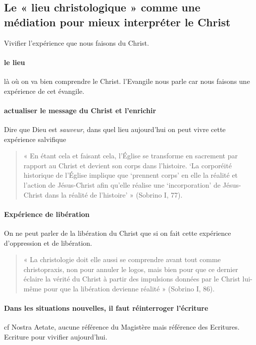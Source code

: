 \subsection{Le « lieu christologique » comme une médiation pour mieux interpréter le Christ}

Vivifier l'expérience que nous faisons du Christ.
\paragraph{le lieu} là où on va bien comprendre le Christ. l'Evangile nous parle car nous faisons une expérience de cet évangile. 

\paragraph{actualiser le message du Christ et l'enrichir}
\begin{Ex}
    Dire que Dieu est \textit{sauveur}, dans quel lieu aujourd'hui on peut vivre cette expérience salvifique
\end{Ex}

\begin{quote}
    « En étant cela et faisant cela, l’Église se transforme en sacrement par rapport au Christ et devient son
corps dans l’histoire. ‘La corporéité historique de l’Église implique que ‘prennent corps’ en elle la
réalité et l’action de Jésus-Christ afin qu’elle réalise une ‘incorporation’ de Jésus-Christ dans la réalité
de l’histoire’ » (Sobrino I, 77).
\end{quote}

\paragraph{Expérience de libération} On ne peut parler de la libération du Christ que si on fait cette expérience d'oppression et de libération. 

\begin{quote}
    « La christologie doit elle aussi se comprendre avant tout comme christopraxis, non pour annuler le
logos, mais bien pour que ce dernier éclaire la vérité du Christ à partir des impulsions données par le
Christ lui-même pour que la libération devienne réalité » (Sobrino I, 86).
\end{quote}

\paragraph{Dans les situations nouvelles, il faut réinterroger l'écriture} cf Nostra Aetate, aucune référence du Magistère mais référence des Ecritures. Ecriture pour vivifier aujourd'hui.



